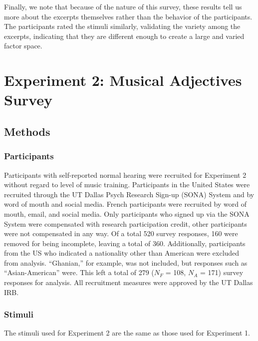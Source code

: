 \documentclass[
  english,
  man,floatsintext]{apa6}
\begin{document}
Finally, we note that because of the nature of this survey, these results tell us more about the excerpts themselves rather than the behavior of the participants. The participants rated the stimuli similarly, validating the variety among the excerpts, indicating that they are different enough to create a large and varied factor space.

\hypertarget{experiment-2-musical-adjectives-survey}{%
\section{Experiment 2: Musical Adjectives Survey}\label{experiment-2-musical-adjectives-survey}}

\hypertarget{methods-1}{%
\subsection{Methods}\label{methods-1}}

\hypertarget{participants-2}{%
\subsubsection{Participants}\label{participants-2}}

Participants with self-reported normal hearing were recruited for Experiment 2 without regard to level of music training. Participants in the United States were recruited through the UT Dallas Psych Research Sign-up (SONA) System and by word of mouth and social media. French participants were recruited by word of mouth, email, and social media. Only participants who signed up via the SONA System were compensated with research participation credit, other participants were not compensated in any way. Of a total 520 survey responses, 160 were removed for being incomplete, leaving a total of 360. Additionally, participants from the US who indicated a nationality other than American were excluded from analysis. ``Ghanian,'' for example, was not included, but responses such as ``Asian-American'' were. This left a total of 279 (\(\textit{N}_F\) = 108, \(\textit{N}_A\) = 171) survey responses for analysis. All recruitment measures were approved by the UT Dallas IRB.

\hypertarget{stimuli-1}{%
\subsubsection{Stimuli}\label{stimuli-1}}

The stimuli used for Experiment 2 are the same as those used for Experiment 1.
\end{document}
